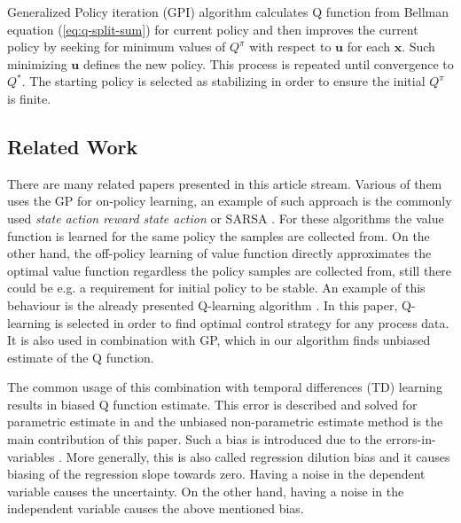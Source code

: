 \documentclass{ifacconf}
\begin{document}
Generalized Policy iteration (GPI) algorithm \citep{ecc19ref:Sutton_Reinforcement_Learning}
calculates Q function from Bellman equation (\ref{eq:q-split-sum})
for current policy and then improves the current policy by seeking
for minimum values of $Q^{\pi}$ with respect to $\mathbf{u}$ for
each $\mathbf{x}$. Such minimizing $\mathbf{u}$ defines the new
policy. This process is repeated until convergence to $Q^{*}$. The
starting policy is selected as stabilizing in order to ensure the
initial $Q^{\pi}$ is finite.

\subsection{Related Work}

There are many related papers presented in this article stream. Various
of them uses the GP for on-policy learning, an example of such approach
is the commonly used \emph{state action reward state action} or SARSA
\citep{ecc19ref:Sutton_Reinforcement_Learning}. For these algorithms
the value function is learned for the same policy the samples are
collected from. On the other hand, the off-policy learning of value
function directly approximates the optimal value function regardless
the policy samples are collected from, still there could be e.g. a
requirement for initial policy to be stable. An example of this behaviour
is the already presented Q-learning algorithm \citep{ecc19ref:Chowdhary_Off_Policy}.
In this paper, Q-learning is selected in order to find optimal control
strategy for any process data. It is also used in combination with
GP, which in our algorithm finds unbiased estimate of the Q function.

The common usage of this combination with temporal differences (TD) learning  \citep{ecc19ref:Engel_Bayes_Meets_Bellman,ecc19ref:Engel_Reinforcement_Learning_with_GP} results in biased Q function estimate. This error is described and solved for parametric estimate in \citep{ecc19ref:Bratke_Linear_Least_Squares_Algo} and the unbiased non-parametric estimate method is the main contribution of this paper. Such a bias is introduced due to the errors-in-variables \citep{ecc19ref:Young_Recursive_estimation}. More generally, this is also called regression dilution bias \citep{ecc19ref:Fuller_Measurement_error_models} and it causes biasing of the regression slope towards zero. Having a noise in the dependent variable causes the uncertainty. On the other hand, having a noise in the independent variable causes the above mentioned bias.
\end{document}
